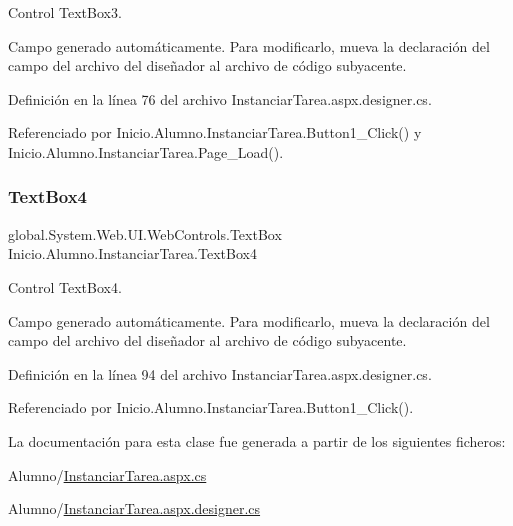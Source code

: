 Control Text\+Box3. 

Campo generado automáticamente. Para modificarlo, mueva la declaración del campo del archivo del diseñador al archivo de código subyacente. 

Definición en la línea 76 del archivo Instanciar\+Tarea.\+aspx.\+designer.\+cs.



Referenciado por Inicio.\+Alumno.\+Instanciar\+Tarea.\+Button1\+\_\+\+Click() y Inicio.\+Alumno.\+Instanciar\+Tarea.\+Page\+\_\+\+Load().

\mbox{\label{classInicio_1_1Alumno_1_1InstanciarTarea_a3b1e002c68f16a23a0bf3bb48cd09b27}} 
\subsubsection{\texorpdfstring{TextBox4}{TextBox4}}
{\footnotesize\ttfamily global.\+System.\+Web.\+U\+I.\+Web\+Controls.\+Text\+Box Inicio.\+Alumno.\+Instanciar\+Tarea.\+Text\+Box4\hspace{0.3cm}{\ttfamily [protected]}}



Control Text\+Box4. 

Campo generado automáticamente. Para modificarlo, mueva la declaración del campo del archivo del diseñador al archivo de código subyacente. 

Definición en la línea 94 del archivo Instanciar\+Tarea.\+aspx.\+designer.\+cs.



Referenciado por Inicio.\+Alumno.\+Instanciar\+Tarea.\+Button1\+\_\+\+Click().



La documentación para esta clase fue generada a partir de los siguientes ficheros\+:\begin{DoxyCompactItemize}
\item 
Alumno/\mbox{\hyperlink{InstanciarTarea_8aspx_8cs}{Instanciar\+Tarea.\+aspx.\+cs}}\item 
Alumno/\mbox{\hyperlink{InstanciarTarea_8aspx_8designer_8cs}{Instanciar\+Tarea.\+aspx.\+designer.\+cs}}\end{DoxyCompactItemize}
